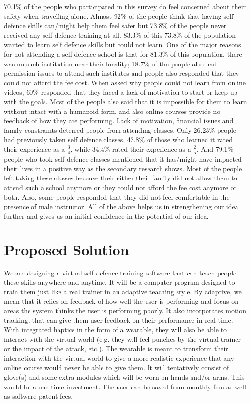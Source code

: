 70.1\% of the people who participated in this survey do feel concerned about their safety when travelling alone.  Almost 92\% of the people think that having self-defence skills can/might help them feel safer but 73.8\% of the people never received any self defence training at all. 83.3\% of this 73.8\% of the population wanted to learn self defence skills but could not learn. One of the major reasons for not attending a self defence school is that for 81.3\% of this population, there was no such institution near their locality; 18.7\%  of the people also had permission issues to attend such institutes and people also responded that they could not afford the fee cost. When asked why people could not learn from online videos, 60\% responded that they faced a lack of motivation to start or keep up with the goals. Most of the people also said that it is impossible for them to learn without intact with a humanoid form, and also online courses provide no feedback of how they are performing. Lack of motivation, financial issues and family constraints deterred people from attending classes. Only 26.23\% people had previously taken self defence classes. 43.8\% of those who learned it rated their experience as a \(\frac{3}{4}\), while 34.4\% rated their experience as a \(\frac{2}{5}\). And 79.1\% people who took self defence classes mentioned that it has/might have impacted their lives in a positive way as the secondary research shows. Most of the people left taking these classes because their either their family did not allow them to attend such a school anymore or they could not afford the fee cost anymore or both. Also, some people responded that they did not feel comfortable in the presence of male instructor.  All of the above helps us in strengthening our idea further and gives us an initial confidence in the potential of our idea. 

\section{Proposed Solution}

We are designing a virtual self-defence training software that can teach people these skills anywhere and anytime. It will be a computer program designed to train them just like a real trainer in an adaptive teaching style. By adaptive, we mean that it relies on feedback of how well the user is performing and focus on areas the system thinks the user is performing poorly. It also incorporates motion tracking, that can give them user feedback on their performance in real-time. With integrated haptics in the form of a wearable, they will also be able to interact with the virtual world (e.g. they will feel punches by the virtual trainer or the impact of the attack, etc.). The wearable is meant to transform their interaction with the virtual world to give a more realistic experience that any online course would never be able to give them. It will tentatively consist of glove(s) and some extra modules which will be worn on hands and/or arms. This would be a one time investment. The user can be saved from monthly fees as well as software patent fees.

